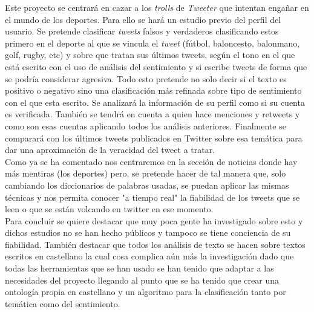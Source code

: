 \documentclass[../all.tex]{subfiles}
\begin{document}
    Este proyecto se centrará en cazar a los \textit{trolls} de \textit{Tweeter} que  intentan engañar en el mundo de los deportes. Para ello se hará un estudio previo del perfil del usuario. Se pretende clasificar \textit{tweets} falsos y verdaderos clasificando estos primero en el deporte al que se vincula el \textit{tweet} (fútbol, baloncesto, balonmano, golf, rugby, etc) y sobre que tratan sus últimos tweets, según el tono en el que está escrito con el uso de análisis del sentimiento y si escribe tweets de forma que se podría considerar agresiva. Todo esto pretende no solo decir si el texto es positivo o negativo sino una clasificación más refinada sobre tipo de sentimiento con el que esta escrito. Se analizará la información de su perfil como si su cuenta es verificada. También se tendrá en cuenta a quien hace menciones y retweets y como son esas cuentas aplicando todos los análisis anteriores. Finalmente se comparará con los últimos tweets publicados en Twitter sobre esa temática para dar una aproximación de la veracidad del tweet a tratar.\\
    
    Como ya se ha comentado nos centraremos en la sección de noticias donde hay más mentiras (los deportes) pero, se pretende hacer de tal manera que, solo cambiando los diccionarios de palabras usadas, se puedan aplicar las mismas técnicas y nos permita conocer "a tiempo real" la fiabilidad de los tweets que se leen o que se están volcando en twitter en ese momento. \\
    
    Para concluir se quiere destacar que muy poca gente ha investigado sobre esto y dichos estudios no se han hecho públicos y tampoco se tiene conciencia de su fiabilidad. También destacar que todos los análisis de texto se hacen sobre textos escritos en castellano la cual cosa complica aún más la investigación dado que todas las herramientas que se han usado se han tenido que adaptar a las necesidades del proyecto llegando al punto que se ha tenido que crear una ontología propia en castellano y un algoritmo para la clasificación tanto por temática como del sentimiento.
    

\end{document}
